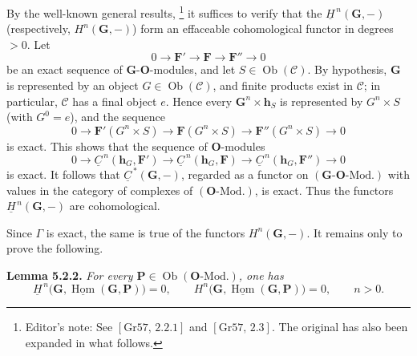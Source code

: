 By the well-known general results,
\footnote{Editor's note: See \([\mathrm{Gr}57,\,2.2.1]\) and
\([\mathrm{Gr}57,\,2.3]\). The original has also been expanded in what
follows.}
it suffices to verify that the \(\underline H^{\,n}(\mathbf G,-)\)
(respectively, \(H^n(\mathbf G,-)\)) form an effaceable cohomological
functor in degrees \(>0\). Let
\[
  0\longrightarrow\mathbf F'
   \longrightarrow\mathbf F
   \longrightarrow\mathbf F''
   \longrightarrow0
\]
be an exact sequence of \(\mathbf G\)-\(\mathbf O\)-modules, and let
\(S\in\operatorname{Ob}(\mathscr C)\). By hypothesis, \(\mathbf G\) is
represented by an object \(G\in\operatorname{Ob}(\mathscr C)\), and finite
products exist in \(\mathscr C\); in particular, \(\mathscr C\) has a
final object \(e\). Hence every \(\mathbf G^n\times\mathbf h_S\) is
represented by \(G^n\times S\) (with \(G^0=e\)), and the sequence
\[
  0\longrightarrow\mathbf F'(G^n\times S)
   \longrightarrow\mathbf F(G^n\times S)
   \longrightarrow\mathbf F''(G^n\times S)
   \longrightarrow0
\]
is exact. This shows that the sequence of \(\mathbf O\)-modules
\[
  0\longrightarrow\underline C^{\,n}(\mathbf h_G,\mathbf F')
   \longrightarrow\underline C^{\,n}(\mathbf h_G,\mathbf F)
   \longrightarrow\underline C^{\,n}(\mathbf h_G,\mathbf F'')
   \longrightarrow0
\]
is exact. It follows that \(\underline C^{\,*}(\mathbf G,-)\), regarded as
a functor on \((\mathbf G\text{-}\mathbf O\text{-Mod.})\) with values in
the category of complexes of \((\mathbf O\text{-Mod.})\), is exact. Thus
the functors \(\underline H^{\,n}(\mathbf G,-)\) are cohomological.

Since \(\Gamma\) is exact, the same is true of the functors
\(H^n(\mathbf G,-)\). It remains only to prove the following.

\medskip
\noindent\textbf{Lemma 5.2.2.}
\textit{For every \(\mathbf P\in\operatorname{Ob}(\mathbf O\text{-Mod.})\),
one has}
\[
  \underline H^{\,n}\bigl(
    \mathbf G,\underline{\operatorname{Hom}}(\mathbf G,\mathbf P)
  \bigr)=0,
  \qquad
  H^n\bigl(
    \mathbf G,\underline{\operatorname{Hom}}(\mathbf G,\mathbf P)
  \bigr)=0,
  \qquad n>0.
\]

